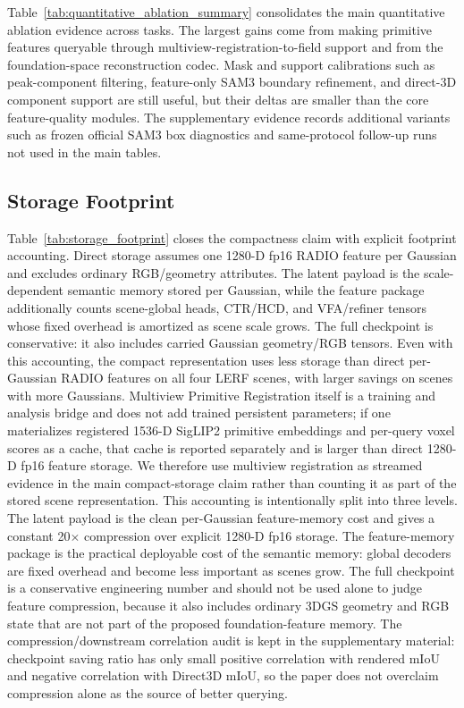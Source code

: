 \documentclass[journal,twoside]{IEEEtran}
\begin{document}
Table~\ref{tab:quantitative_ablation_summary} consolidates the main quantitative
ablation evidence across tasks. The largest gains come from making primitive
features queryable through multiview-registration-to-field support and from the
foundation-space reconstruction codec. Mask and support calibrations such as
peak-component filtering, feature-only SAM3 boundary refinement, and direct-3D
component support are still useful, but their deltas are smaller than the core
feature-quality modules. The supplementary evidence records additional variants
such as frozen official SAM3 box diagnostics and same-protocol follow-up runs
not used in the main tables.

\subsection{Storage Footprint}



Table~\ref{tab:storage_footprint} closes the compactness claim with explicit
footprint accounting. Direct storage assumes one 1280-D fp16 RADIO feature per
Gaussian and excludes ordinary RGB/geometry attributes. The latent payload is
the scale-dependent semantic memory stored per Gaussian, while the feature
package additionally counts scene-global heads, CTR/HCD, and VFA/refiner tensors
whose fixed overhead is amortized as scene scale grows. The full checkpoint is
conservative: it also includes carried Gaussian geometry/RGB tensors. Even with
this accounting, the compact representation uses less storage than direct
per-Gaussian RADIO features on all four LERF scenes, with larger savings on
scenes with more Gaussians. Multiview Primitive Registration itself is a
training and analysis bridge and does not add trained persistent parameters; if one
materializes registered 1536-D SigLIP2 primitive embeddings and per-query voxel
scores as a cache, that cache is reported separately and is larger than direct
1280-D fp16 feature storage. We therefore use multiview registration as streamed
evidence in the main compact-storage claim rather than counting it as part of
the stored scene representation.
This accounting is intentionally split into three levels. The latent payload is
the clean per-Gaussian feature-memory cost and gives a constant 20$\times$
compression over explicit 1280-D fp16 storage. The feature-memory package is the
practical deployable cost of the semantic memory: global decoders are fixed
overhead and become less important as scenes grow. The full checkpoint is a
conservative engineering number and should not be used alone to judge feature
compression, because it also includes ordinary 3DGS geometry and RGB state that
are not part of the proposed foundation-feature memory.
The compression/downstream correlation audit is kept in the supplementary material:
checkpoint saving ratio has only small positive correlation with rendered mIoU
and negative correlation with Direct3D mIoU, so the paper does not overclaim
compression alone as the source of better querying.
\end{document}
